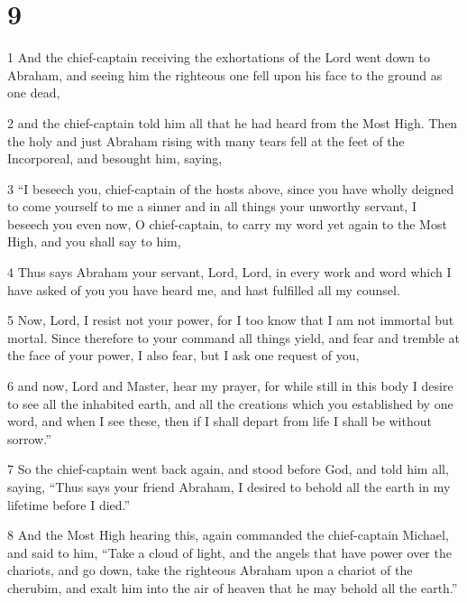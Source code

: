 \chapter{9}

\par 1 And the chief-captain receiving the exhortations of the Lord went down to Abraham, and seeing him the righteous one fell upon his face to the ground as one dead, 

\par 2 and the chief-captain told him all that he had heard from the Most High. Then the holy and just Abraham rising with many tears fell at the feet of the Incorporeal, and besought him, saying, 

\par 3 “I beseech you, chief-captain of the hosts above, since you have wholly deigned to come yourself to me a sinner and in all things your unworthy servant, I beseech you even now, O chief-captain, to carry my word yet again to the Most High, and you shall say to him, 

\par 4 Thus says Abraham your servant, Lord, Lord, in every work and word which I have asked of you you have heard me, and hast fulfilled all my counsel. 

\par 5 Now, Lord, I resist not your power, for I too know that I am not immortal but mortal. Since therefore to your command all things yield, and fear and tremble at the face of your power, I also fear, but I ask one request of you, 

\par 6 and now, Lord and Master, hear my prayer, for while still in this body I desire to see all the inhabited earth, and all the creations which you established by one word, and when I see these, then if I shall depart from life I shall be without sorrow.” 

\par 7 So the chief-captain went back again, and stood before God, and told him all, saying, “Thus says your friend Abraham, I desired to behold all the earth in my lifetime before I died.” 

\par 8 And the Most High hearing this, again commanded the chief-captain Michael, and said to him, “Take a cloud of light, and the angels that have power over the chariots, and go down, take the righteous Abraham upon a chariot of the cherubim, and exalt him into the air of heaven that he may behold all the earth.”

